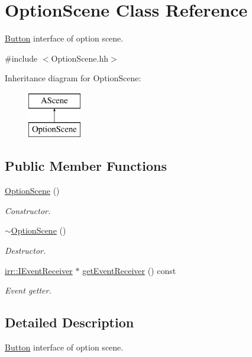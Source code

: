 \hypertarget{classOptionScene}{}\section{Option\+Scene Class Reference}
\label{classOptionScene}


\hyperlink{classButton}{Button} interface of option scene.  




{\ttfamily \#include $<$Option\+Scene.\+hh$>$}

Inheritance diagram for Option\+Scene\+:\begin{figure}[H]
\begin{center}
\leavevmode
\includegraphics[height=2.000000cm]{classOptionScene}
\end{center}
\end{figure}
\subsection*{Public Member Functions}
\begin{DoxyCompactItemize}
\item 
\hyperlink{classOptionScene_ac0dfacf1988c5dcfe2520970735fab10}{Option\+Scene} ()
\begin{DoxyCompactList}\small\item\em Constructor. \end{DoxyCompactList}\item 
\hyperlink{classOptionScene_ab8de71400c4ed7f2a47cedfedb13f327}{$\sim$\+Option\+Scene} ()
\begin{DoxyCompactList}\small\item\em Destructor. \end{DoxyCompactList}\item 
\hyperlink{classirr_1_1IEventReceiver}{irr\+::\+I\+Event\+Receiver} $\ast$ \hyperlink{classOptionScene_a8848b9040ee7fd9c1d05a22181c5e053}{get\+Event\+Receiver} () const
\begin{DoxyCompactList}\small\item\em Event getter. \end{DoxyCompactList}\end{DoxyCompactItemize}


\subsection{Detailed Description}
\hyperlink{classButton}{Button} interface of option scene. 


